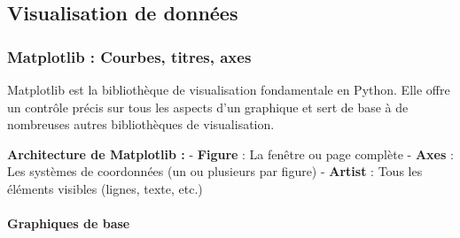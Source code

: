 \documentclass[11pt]{article}
\begin{document}
\subsection{Visualisation de données}\label{visualisation-de-donnuxe9es}

\subsubsection{Matplotlib : Courbes, titres,
axes}\label{matplotlib-courbes-titres-axes}

Matplotlib est la bibliothèque de visualisation fondamentale en Python.
Elle offre un contrôle précis sur tous les aspects d'un graphique et
sert de base à de nombreuses autres bibliothèques de visualisation.

\textbf{Architecture de Matplotlib :} - \textbf{Figure} : La fenêtre ou
page complète - \textbf{Axes} : Les systèmes de coordonnées (un ou
plusieurs par figure) - \textbf{Artist} : Tous les éléments visibles
(lignes, texte, etc.)

\paragraph{Graphiques de base}\label{graphiques-de-base}
\end{document}
